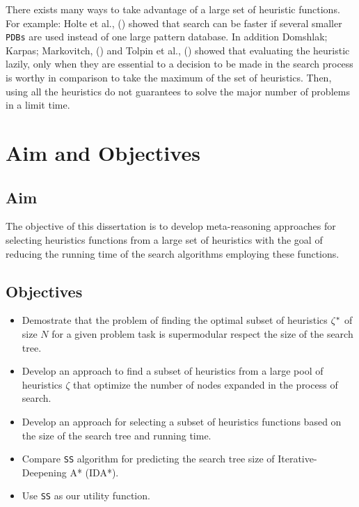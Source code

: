 There exists many ways to take advantage of a large set of heuristic functions. For example: Holte et al., (\citeyear{holte2006maximizing}) showed that search can be faster if several smaller \texttt{PDBs} are used instead of one large pattern database. In addition Domshlak; Karpas; Markovitch, (\citeyear{domshlak2010max}) and Tolpin et al.,  (\citeyear{tolpin2013towards}) showed that evaluating the heuristic lazily, only when they are essential to a decision to be made in the search process is worthy in comparison to take the maximum of the set of heuristics. Then, using all the heuristics do not guarantees to solve the major number of problems in a limit time.
\section{Aim and Objectives}
\subsection{Aim}
\noindent
The objective of this dissertation is to develop meta-reasoning approaches for selecting heuristics functions from a large set of heuristics with the goal of reducing the running time of the search algorithms employing these functions.

\subsection{Objectives}
\noindent

\begin{itemize}
  \item Demostrate that the problem of finding the optimal subset of heuristics $\zeta\sp{*}$ of size $N$ for a given problem task is supermodular respect the size of the search tree.
  
  \item Develop an approach to find a subset of heuristics from a large pool of heuristics $\zeta$ that optimize the number of nodes expanded in the process of search.
  
  \item Develop an approach for selecting a subset of heuristics functions based on the size of the search tree and running time.

  \item Compare \texttt{SS} algorithm for predicting the search tree size of Iterative-Deepening A* (IDA*).
  
  \item Use \texttt{SS} as our utility function.

\end{itemize}
